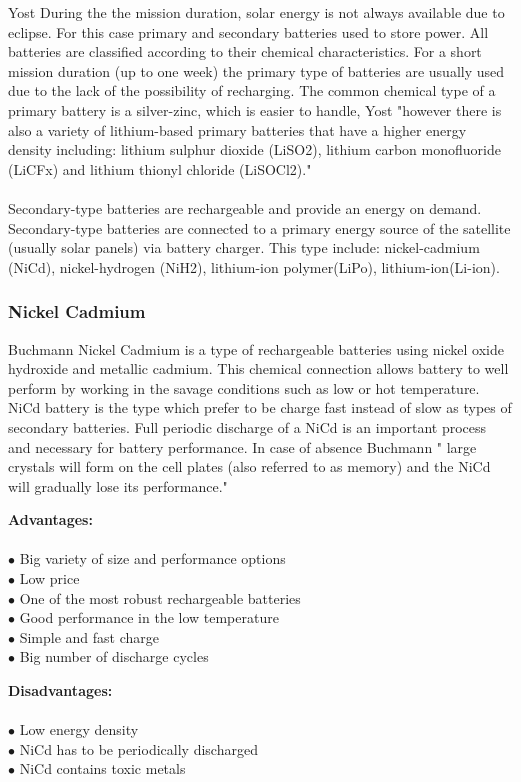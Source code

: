 Yost\cite{1} During the the mission duration, solar energy is not always available due to eclipse. For this case primary and secondary batteries used to store power. All batteries are classified according to their chemical characteristics. For a short mission duration (up to one week)  the primary type of batteries are usually used due to the lack of the possibility of recharging. The common chemical type of a primary battery is a silver-zinc, which is easier to handle, Yost\cite{1} "however there is also a variety of lithium-based primary batteries that have a higher energy density including: lithium sulphur dioxide (LiSO2), lithium carbon monofluoride (LiCFx) and lithium thionyl chloride (LiSOCl2)."\\
\\
Secondary-type batteries are rechargeable and provide an energy on demand. Secondary-type batteries are connected to a primary energy source of the satellite (usually solar panels) via battery charger. This type include: nickel-cadmium (NiCd), nickel-hydrogen (NiH2), lithium-ion polymer(LiPo), lithium-ion(Li-ion).

\subsubsection{Nickel Cadmium \label{sec:tech}}
 Buchmann\cite{7} Nickel Cadmium is a type of rechargeable batteries using nickel oxide hydroxide and metallic cadmium. This chemical connection allows battery to well perform by working in the savage conditions such as low or hot temperature. NiCd battery is the type which prefer to be charge fast instead of slow as types of secondary batteries. Full periodic discharge of a NiCd is an important process and necessary for battery performance. In case of absence  Buchmann\cite{7} " large crystals will form on the cell plates (also referred to as memory) and the NiCd will gradually lose its performance."
 
 \newpage

\begin{multicols}{2}

	\textbf{Advantages:} \\ \\
	$\bullet$ Big variety of size and performance options\\
	$\bullet$ Low price\\
	$\bullet$ One of the most robust rechargeable batteries\\
	$\bullet$ Good performance in the low temperature\\
	$\bullet$ Simple and fast charge\\
	$\bullet$ Big number of discharge cycles\\
	
	
	\columnbreak
	
	\textbf{Disadvantages:} \\ \\
	$\bullet$ Low energy density\\
	$\bullet$ NiCd has to be periodically discharged\\
	$\bullet$ NiCd contains toxic metals\\ 


\end{multicols}

